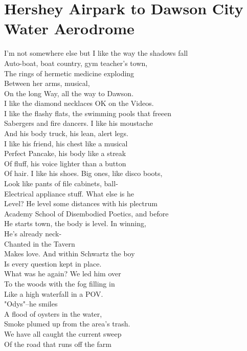 \documentclass[smalldemyvopaper,11pt,twoside,onecolumn,openright,extrafontsizes]{memoir}
\begin{document}
\chapter{Hershey Airpark to Dawson City Water Aerodrome}
I'm not somewhere else but I like the way the shadows fall
\\Auto-boat, boat country, gym teacher's town,
\\The rings of hermetic medicine exploding
\\Between her arms, musical,
\\On the long Way, all the way to Dawson.
\\I like the diamond necklaces OK on the Videos.
\\I like the flashy flats, the swimming pools that freeen
\\Sabergers and fire dancers. I like his moustache
\\And his body truck, his lean, alert legs.
\\I like his friend, his chest like a musical
\\Perfect Pancake, his body like a streak
\\Of fluff, his voice lighter than a button
\\Of hair. I like his shoes. Big ones, like disco boots,
\\Look like pants of file cabinets, ball-
\\Electrical appliance stuff. What else is he
\\Level? He level some distances with his plectrum
\\Academy School of Disembodied Poetics, and before
\\He starts town, the body is level. In winning,
\\He's already neck-
\\Chanted in the Tavern
\\Makes love. And within Schwartz the boy
\\Is every question kept in place.
\\What was he again? We led him over
\\To the woods with the fog filling in
\\Like a high waterfall in a POV.
\\"Odys"--he smiles
\\A flood of oysters in the water,
\\Smoke plumed up from the area's trash.
\\We have all caught the current sweep
\\Of the road that runs off the farm
\end{document}

